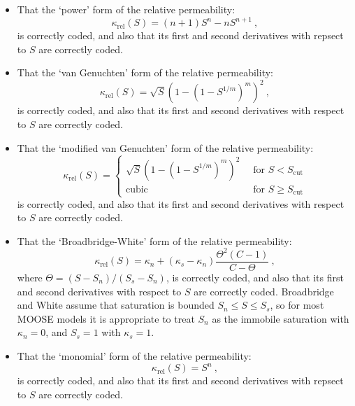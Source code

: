 \documentclass[]{scrreprt}
\begin{document}
\begin{itemize}

\item That the `power' form of the relative permeability:
\begin{equation}
\kappa_{\mathrm{rel}}(S) = (n+1)S^{n} - nS^{n+1} \ ,
\end{equation}
is correctly coded, and also that its first and second derivatives
with repsect to $S$ are correctly coded.

\item That the `van Genuchten' form of the relative permeability:
\begin{equation}
\kappa_{\mathrm{rel}}(S) = \sqrt{S}\left(1 - \left(1 -
S^{1/m}\right)^{m}\right)^{2} \ ,
\end{equation}
is correctly coded, and also that its first and second derivatives
with respect to $S$ are correctly coded.

\item That the `modified van Genuchten' form of the relative permeability:
\begin{equation}
\kappa_{\mathrm{rel}}(S) = \left\{
\begin{array}{ll}
\sqrt{S}\left(1 - \left(1 -
S^{1/m}\right)^{m}\right)^{2} \ & \mbox{ for } S<S_{\mathrm{cut}} \\
\mbox{cubic} \ & \mbox{ for } S \geq S_{\mathrm{cut}}
\end{array}
\right.
\end{equation}
is correctly coded, and also that its first and second derivatives
with respect to $S$ are correctly coded.

\item That the `Broadbridge-White' form of the relative permeability:
\begin{equation}
\kappa_{\mathrm{rel}}(S) = \kappa_{n} +
(\kappa_{s}-\kappa_{n})\frac{\Theta^{2}(C-1)}{C-\Theta} \ ,
\label{bw.krel}
\end{equation}
where $\Theta = (S-S_{n})/(S_{s}-S_{n})$,
is correctly coded, and also that its first and second derivatives
with respect to $S$ are correctly coded.  Broadbridge and White assume
that saturation is bounded $S_{n}\leq S\leq S_{s}$, so for most MOOSE
models it is appropriate to treat $S_{n}$ as the immobile saturation
with $\kappa_{n}=0$, and $S_{s}=1$ with $\kappa_{s}=1$.

\item That the `monomial' form of the relative permeability:
\begin{equation}
\kappa_{\mathrm{rel}}(S) = S^{n} \ ,
\end{equation}
is correctly coded, and also that its first and second derivatives
with repsect to $S$ are correctly coded.


\end{itemize}
\end{document}
